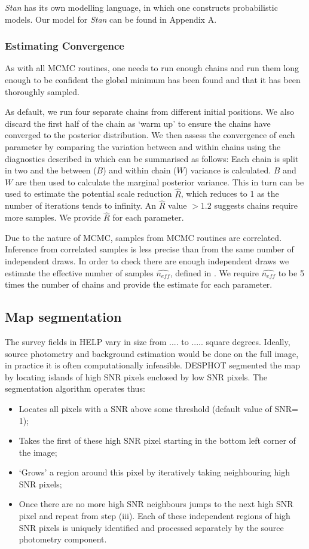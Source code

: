 \documentclass[useAMS,usenatbib]{mn2e}
\begin{document}
\textit{Stan} has its own modelling language, in which one constructs probabilistic models. Our model for \textit{Stan} can be found in Appendix A.
\subsubsection{Estimating Convergence}\label{sec:conv}
As with all MCMC routines, one needs to run enough chains and run them long enough to be confident the global minimum has been found and that it has been thoroughly sampled. 

As default, we run four separate chains from different initial positions. We also discard the first half of the chain as `warm up' to ensure the chains have converged to the posterior distribution. We then assess the convergence of each parameter by comparing the variation between and within chains using the diagnostics described in \cite{BDA3} which can be summarised as follows: Each chain is split in two and the between ($B$) and within chain ($W$) variance is calculated. $B$ and $W$ are then used to calculate the marginal posterior variance. This in turn can be used to estimate the potential scale reduction $\hat{R}$, which reduces to 1 as the number of iterations tends to infinity. An $\hat{R}$ value $\gt 1.2$ suggests chains require more samples. We provide $\hat{R}$ for each parameter.

Due to the nature of MCMC, samples from MCMC routines are correlated. Inference from correlated samples is less precise than from the same number of independent draws. In order to check there are enough independent draws we estimate the effective number of samples $\hat{n_{eff}}$, defined in \cite{BDA3}. We require $\hat{n_{eff}}$ to be 5 times the number of chains and provide the estimate for each parameter.

\subsection{Map segmentation}
The survey fields in HELP vary in size from .... to ..... square degrees. Ideally, source photometry and background estimation would be done on the full image, in practice it is often computationally infeasible. DESPHOT segmented the map by locating islands of high SNR pixels enclosed by low SNR pixels. The segmentation algorithm operates thus:
\begin{itemize}
\item Locates all pixels with a SNR above some threshold (default value of SNR= 1);
\item Takes the first of these high SNR pixel starting in the bottom left corner of the image;
\item `Grows' a region around this pixel by iteratively taking neighbouring high SNR pixels;
\item Once there are no more high SNR neighbours jumps to the next high SNR pixel and repeat from step (iii).
Each of these independent regions of high SNR pixels is uniquely identified and processed separately by the source photometry component.
\end{itemize}
\end{document}

